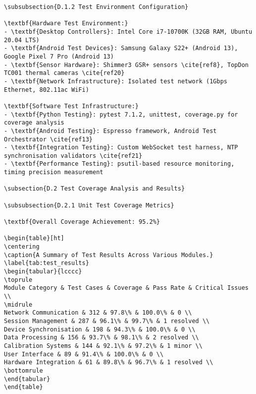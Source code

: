 \begin{verbatim}
\subsubsection{D.1.2 Test Environment Configuration}

\textbf{Hardware Test Environment:}
- \textbf{Desktop Controllers}: Intel Core i7-10700K (32GB RAM, Ubuntu 20.04 LTS)
- \textbf{Android Test Devices}: Samsung Galaxy S22+ (Android 13), Google Pixel 7 Pro (Android 13)
- \textbf{Sensor Hardware}: Shimmer3 GSR+ sensors \cite{ref8}, TopDon TC001 thermal cameras \cite{ref20}
- \textbf{Network Infrastructure}: Isolated test network (1Gbps Ethernet, 802.11ac WiFi)

\textbf{Software Test Infrastructure:}
- \textbf{Python Testing}: pytest 7.1.2, unittest, coverage.py for coverage analysis
- \textbf{Android Testing}: Espresso framework, Android Test Orchestrator \cite{ref13}
- \textbf{Integration Testing}: Custom WebSocket test harness, NTP synchronisation validators \cite{ref21}
- \textbf{Performance Testing}: psutil-based resource monitoring, timing precision measurement

\subsection{D.2 Test Coverage Analysis and Results}

\subsubsection{D.2.1 Unit Test Coverage Metrics}

\textbf{Overall Coverage Achievement: 95.2%}

\begin{table}[ht]
\centering
\caption{A Summary of Test Results Across Various Modules.}
\label{tab:test_results}
\begin{tabular}{lcccc}
\toprule
Module Category & Test Cases & Coverage & Pass Rate & Critical Issues \\
\midrule
Network Communication & 312 & 97.8\% & 100.0\% & 0 \\
Session Management & 287 & 96.1\% & 99.7\% & 1 resolved \\
Device Synchronisation & 198 & 94.3\% & 100.0\% & 0 \\
Data Processing & 156 & 93.7\% & 98.1\% & 2 resolved \\
Calibration Systems & 144 & 92.1\% & 97.2\% & 1 minor \\
User Interface & 89 & 91.4\% & 100.0\% & 0 \\
Hardware Integration & 61 & 89.8\% & 96.7\% & 1 resolved \\
\bottomrule
\end{tabular}
\end{table}


\end{verbatim}
